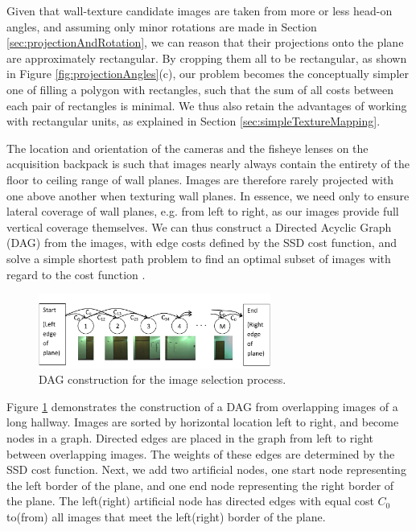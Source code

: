 \documentclass[]{spie}  %
\begin{document}
Given that wall-texture candidate images are taken from more or less
head-on angles, and assuming only minor rotations are made in Section
\ref{sec:projectionAndRotation}, we can reason that their projections
onto the plane are approximately rectangular. By cropping them all to
be rectangular, as shown in Figure \ref{fig:projectionAngles}(c), our
problem becomes the conceptually simpler one of filling a polygon with
rectangles, such that the sum of all costs between each pair of
rectangles is minimal. We thus also retain the advantages of working
with rectangular units, as explained in Section
\ref{sec:simpleTextureMapping}.

The location and orientation of the cameras and the fisheye lenses on
the acquisition backpack is such that images nearly always contain the
entirety of the floor to ceiling range of wall planes. Images are
therefore rarely projected with one above another when texturing wall
planes. In essence, we need only to ensure lateral coverage of wall
planes, e.g. from left to right, as our images provide full vertical
coverage themselves. We can thus construct a Directed Acyclic Graph
(DAG) from the images, with edge costs defined by the SSD cost
function, and solve a simple shortest path problem to find an optimal
subset of images with regard to the cost function \cite{dijkstra}.

\begin{figure}
  \centering
  \includegraphics[width=3in]{dagCreation.pdf}
  \caption{DAG construction for the image selection process. \\}
  \label{fig:dagCreation}
\end{figure}

Figure \ref{fig:dagCreation} demonstrates the construction of a DAG
from overlapping images of a long hallway. Images are sorted by
horizontal location left to right, and become nodes in a
graph. Directed edges are placed in the graph from left to right
between overlapping images. The weights of these edges are determined
by the SSD cost function. Next, we add two artificial nodes, one start
node representing the left border of the plane, and one end node
representing the right border of the plane. The left(right) artificial
node has directed edges with equal cost $C_0$ to(from) all images that
meet the left(right) border of the plane.
\end{document}
